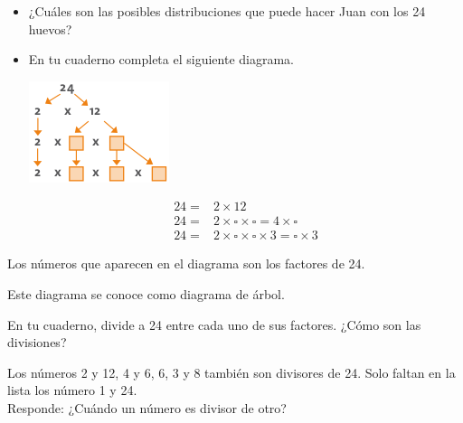 \documentclass[10pt,twoside]{article}
\begin{document}
\begin{itemize}
\item ¿Cuáles son las posibles distribuciones que puede hacer
Juan con los 24 huevos?
\item En tu cuaderno completa el siguiente diagrama.

\begin{minipage}{.4\textwidth}
\includegraphics[scale=.75]{Images/diagramadel24.png} 
\end{minipage}\hfill
\begin{minipage}{.5\textwidth}
\begin{align*}
24=&2\times 12\\
24=&2\times \square \times \square = 4 \times \square \\
24=&2\times \square \times \square \times 3=\square \times 3
\end{align*}
\end{minipage}
\end{itemize}
Los números que aparecen en el diagrama son los factores
de 24.

Este diagrama se conoce como diagrama de árbol.

En tu cuaderno, divide a 24 entre cada uno de sus factores.
¿Cómo son las divisiones?

Los números 2 y 12, 4 y 6, 6, 3 y 8 también son divisores de
24. Solo faltan en la lista los número 1 y 24.\\

Responde: ¿Cuándo un número es divisor de otro?
\end{document}

